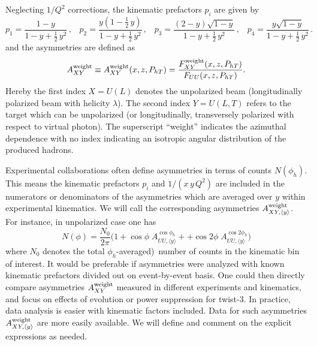 \documentclass[a4paper,11pt]{article}
\newcommand{\be}{\begin{equation}}
\newcommand{\ee}{\end{equation}}
\newcommand{\ba}{\begin{eqnarray}}
\newcommand{\ea}{\end{eqnarray}}
\newcommand{\slim}{\mskip 1.5mu}       %
\newcommand{\asym}[2]{{A_{#1}^{#2}}}
\newcommand{\asympre}[2]{{A_{#1,\langle y\rangle}^{#2}}}
\def\Phperp{P_{hT}}
\begin{document}
Neglecting $1/Q^2$ corrections, the kinematic prefactors $p_i$ are given by 
\be\label{Eq:y-prefactors}
	p_1 = \frac{1-y}{1-y+\frac12\,y^2} 		\, , \;\;\;
	p_2 = \frac{y(1-\frac12\,y)}{1-y+\frac12\,y^2}	\, , \;\;\;
	p_3 = \frac{(2-y)\sqrt{1-y}}{1-y+\frac12\,y^2} 	\, , \;\;\;
	p_4 = \frac{y\sqrt{1-y}}{1-y+\frac12\,y^2}     	\, .
\ee
and the asymmetries are defined as 
\be
	A_{XY}^{\rm weight}\equiv A_{XY}^{\rm weight}(x,z,\Phperp)=
	\frac{F_{XY}^{\rm weight}(x,z,\Phperp)}{F_{UU}(x,z,\Phperp)}.
\ee
Hereby the first index $X=U(L)$ denotes the unpolarized beam
(longitudinally polarized beam with helicity $\lambda$).
The second index $Y=U(L,T)$ refers to the target which can be unpolarized
(or longitudinally, transversely polarized with respect to virtual photon).
The superscript ``weight'' indicates the azimuthal dependence with no index 
indicating an isotropic angular distribution of the produced hadrons.

Experimental collaborations often define asymmetries in terms of counts 
$N(\phi_h)$. This means the kinematic prefactors $p_i$ and $1/(x\,y\,Q^2)$ 
are included in the numerators or denominators of the asymmetries which
are averaged over $y$ within experimental kinematics. We will call the 
corresponding asymmetries $\asympre{XY}{\rm weight}$.
For instance, in unpolarized case one has 
\be
	N(\phi) = \frac{N_0}{2\pi} \biggl(1
		+ \cos\phi\;\asympre{UU}{\cos\phi_h}+
		+ \cos2\phi\;\asympre{UU}{\cos2\phi_h}\Biggr)
\ee
where $N_0$ denotes the total $\phi_h$-averaged)\
number of counts in the kinematic bin of interest.
It would be preferable if asymmetries were analyzed with known kinematic 
prefactors divided out on event-by-event basis. One could then directly 
compare asymmetries $\asym{XY}{\rm weight}$ measured in different 
experiments and kinematics, and focus on effects of evolution 
or power suppression for twist-3. In practice, data analysis is easier
with kinematic factors included. Data for such asymmetries 
$\asympre{XY}{\rm weight}$ are more easily available. We will 
define and comment on the explicit expressions as needed.
\end{document}
